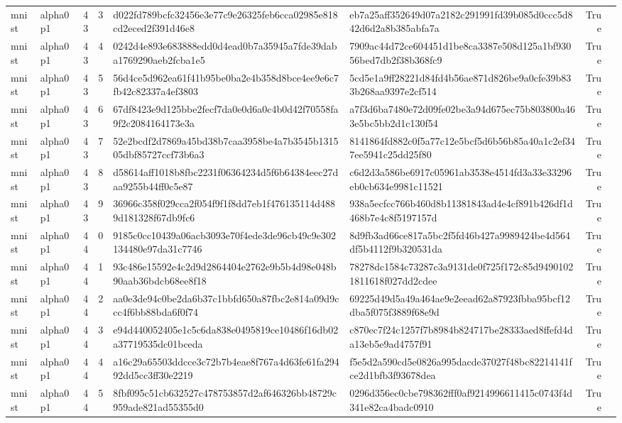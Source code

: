 \begin{tabular}{llrrllrl}
mnist & alpha0p1 & 43 & 3 & d022fd789bcfc32456e3e77c9e26325feb6cca02985e818cd2eced2f391d46e8 & eb7a25aff352649d07a2182c291991fd39b085d0ccc5d842d6d2a8b385abfa7a & True &  \\
mnist & alpha0p1 & 43 & 4 & 0242d4e893e683888edd0d4ead0b7a35945a7fde39daba1769290aeb2fcba1e5 & 7909ac44d72ce604451d1be8ca3387e508d125a1bf93056bed7db2f38b368fc9 & True &  \\
mnist & alpha0p1 & 43 & 5 & 56d4ce5d962ea61f41b95be0ba2e4b358d8bce4ee9e6c7fb42c82337a4ef3803 & 5cd5e1a9ff28221d84fd4b56ae871d826be9a0cfe39b833b268aa9397e2cf514 & True &  \\
mnist & alpha0p1 & 43 & 6 & 67df8423e9d125bbe2fecf7da0e0d6a0c4b0d42f70558fa9f2c2084164173e3a & a7f3d6ba7480e72d09fe02be3a94d675ec75b803800a463e5bc5bb2d1c130f54 & True &  \\
mnist & alpha0p1 & 43 & 7 & 52e2bcdf2d7869a45bd38b7caa3958be4a7b3545b131505dbf85727ccf73b6a3 & 8141864fd882c0f5a77c12e5bcf5d6b56b85a40a1c2ef347ee5941c25dd25f80 & True &  \\
mnist & alpha0p1 & 43 & 8 & d58614aff1018b8fbc2231f06364234d5f6b64384eec27daa9255b44ff0c5e87 & c6d2d3a586be6917c05961ab3538e4514fd3a33e33296eb0cb634e9981c11521 & True &  \\
mnist & alpha0p1 & 43 & 9 & 36966c358f029cca2f054f9f1f8dd7eb1f476135114d4889d181328f67db9fc6 & 938a5ecfcc766b460d8b11381843ad4e4cf891b426df1d468b7e4c8f5197157d & True &  \\
mnist & alpha0p1 & 44 & 0 & 9185c0cc10439a06acb3093e70f4ede3de96cb49c9e302134480e97da31c7746 & 8d9fb3ad66ce817a5bc2f5fd46b427a9989424be4d564df5b4112f9b320531da & True &  \\
mnist & alpha0p1 & 44 & 1 & 93c486e15592e4c2d9d2864404e2762e9b5b4d98e048b90aab36bdcb68ee8f18 & 78278dc1584c73287c3a9131de0f725f172c85d94901021811618f027dd2cdee & True &  \\
mnist & alpha0p1 & 44 & 2 & aa0e3de94c0be2da6b37c1bbfd650a87fbc2e814a09d9ccc4f6bb88bda6f0f74 & 69225d49d5a49a464ae9e2eead62a87923fbba95bcf12dba5f075f3889f68e9d & True &  \\
mnist & alpha0p1 & 44 & 3 & e94d440052405e1c5c6da838e0495819ce10486f16db02a37719535dc01bceda & c870ec7f24c1257f7b8984b824717be28333aed8ffefd4da13eb5e9ad4757f91 & True &  \\
mnist & alpha0p1 & 44 & 4 & a16c29a65503ddcce3c72b7b4eae8f767a4d63fe61fa29492dd5cc3ff30e2219 & f5e5d2a590cd5e0826a995dacde37027f48bc82214141fce2d1bfb3f93678dea & True &  \\
mnist & alpha0p1 & 44 & 5 & 8fbf095c51cb632527c478753857d2af646326bb48729c959ade821ad55355d0 & 0296d356ec0cbe798362fff0af9214996611415c0743f4d341e82ca4badc0910 & True &  \\

\end{tabular}
